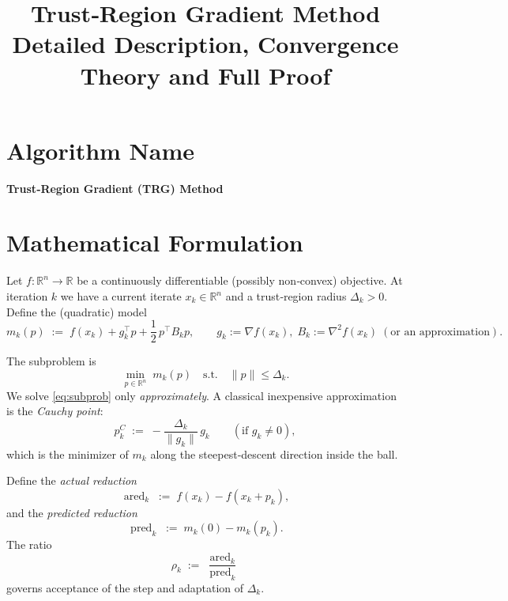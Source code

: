 \documentclass[11pt]{article}
\begin{document}
\title{Trust‑Region Gradient Method \\ Detailed Description, Convergence Theory and Full Proof}
\author{}
\date{}
\maketitle

\tableofcontents
\newpage

\section*{Algorithm Name}
\begin{center}
\textbf{Trust‑Region Gradient (TRG) Method}
\end{center}

\section*{Mathematical Formulation}
Let $f:\mathbb{R}^{n}\rightarrow\mathbb{R}$ be a continuously differentiable (possibly non‑convex) objective.  
At iteration $k$ we have a current iterate $x_{k}\in\mathbb{R}^{n}$ and a trust‑region radius $\Delta_{k}>0$.
Define the (quadratic) model
\[
m_{k}(p)\;:=\;f(x_{k})+g_{k}^{\top}p+\frac12\,p^{\top}B_{k}p,
\qquad 
g_{k}:=\nabla f(x_{k}),\;
B_{k}:=\nabla^{2}f(x_{k})\;(\text{or an approximation}).
\]

The subproblem is
\begin{equation}
\label{eq:subprob}
\min_{p\in\mathbb{R}^{n}}\; m_{k}(p)\quad\text{s.t.}\quad \|p\|\le \Delta_{k}.
\end{equation}
We solve \eqref{eq:subprob} only \emph{approximately}.  
A classical inexpensive approximation is the \emph{Cauchy point}:
\[
p_{k}^{C}\;:=\; -\frac{\Delta_{k}}{\|g_{k}\|}\,g_{k}\qquad(\text{if }g_{k}\neq0),
\]
which is the minimizer of $m_{k}$ along the steepest‑descent direction inside the ball.

Define the \emph{actual reduction}
\[
\operatorname{ared}_{k}\;:=\;f(x_{k})-f(x_{k}+p_{k}),
\]
and the \emph{predicted reduction}
\[
\operatorname{pred}_{k}\;:=\;m_{k}(0)-m_{k}(p_{k}).
\]
The ratio
\[
\rho_{k}\;:=\;\frac{\operatorname{ared}_{k}}{\operatorname{pred}_{k}}
\]
governs acceptance of the step and adaptation of $\Delta_{k}$.
\end{document}
